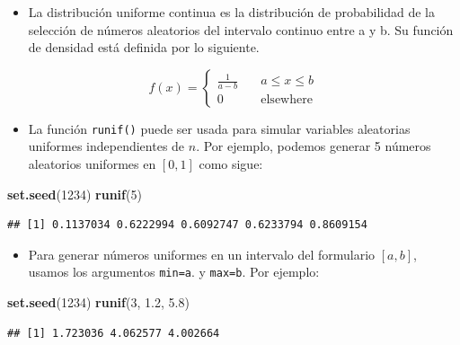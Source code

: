 \documentclass[]{book}
\newenvironment{Shaded}{\begin{snugshade}}{\end{snugshade}}
\newcommand{\KeywordTok}[1]{\textcolor[rgb]{0.13,0.29,0.53}{\textbf{#1}}}
\newcommand{\DecValTok}[1]{\textcolor[rgb]{0.00,0.00,0.81}{#1}}
\newcommand{\FloatTok}[1]{\textcolor[rgb]{0.00,0.00,0.81}{#1}}
\newcommand{\NormalTok}[1]{#1}
\providecommand{\tightlist}{%
  \setlength{\itemsep}{0pt}\setlength{\parskip}{0pt}}
\begin{document}
\begin{itemize}
\tightlist
\item
  La distribución uniforme continua es la distribución de probabilidad
  de la selección de números aleatorios del intervalo continuo entre a y
  b. Su función de densidad está definida por lo siguiente.
\end{itemize}

\[
f(x) = \left\{
\begin{aligned}
\frac{1}{a-b} & \quad a \leq x \leq b\\
0 ~~~~&\quad  \mbox{elsewhere}
\end{aligned}\right.
\]

\begin{itemize}
\tightlist
\item
  La función \texttt{runif()} puede ser usada para simular variables
  aleatorias uniformes independientes de \(n\). Por ejemplo, podemos
  generar 5 números aleatorios uniformes en \([0,1]\) como sigue:
\end{itemize}

\begin{Shaded}
\begin{Highlighting}[]
\KeywordTok{set.seed}\NormalTok{(}\DecValTok{1234}\NormalTok{)}
\KeywordTok{runif}\NormalTok{(}\DecValTok{5}\NormalTok{)}
\end{Highlighting}
\end{Shaded}

\begin{verbatim}
## [1] 0.1137034 0.6222994 0.6092747 0.6233794 0.8609154
\end{verbatim}

\begin{itemize}
\tightlist
\item
  Para generar números uniformes en un intervalo del formulario
  \([a,b]\), usamos los argumentos \texttt{min=a}. y \texttt{max=b}. Por
  ejemplo:
\end{itemize}

\begin{Shaded}
\begin{Highlighting}[]
\KeywordTok{set.seed}\NormalTok{(}\DecValTok{1234}\NormalTok{)}
\KeywordTok{runif}\NormalTok{(}\DecValTok{3}\NormalTok{, }\FloatTok{1.2}\NormalTok{, }\FloatTok{5.8}\NormalTok{)}
\end{Highlighting}
\end{Shaded}

\begin{verbatim}
## [1] 1.723036 4.062577 4.002664
\end{verbatim}
\end{document}
